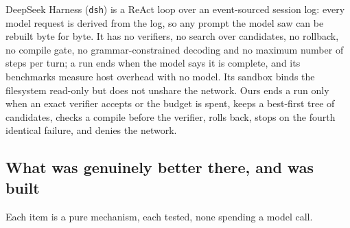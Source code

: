 DeepSeek Harness (\texttt{dsh}) is a ReAct loop over an event-sourced session log: every model request is derived from the log, so any prompt the model
saw can be rebuilt byte for byte. It has no verifiers, no search over candidates, no rollback, no compile gate, no grammar-constrained decoding and no
maximum number of steps per turn; a run ends when the model says it is complete, and its benchmarks measure host overhead with no model. Its sandbox
binds the filesystem read-only but does not unshare the network. Ours ends a run only when an exact verifier accepts or the budget is spent, keeps a
best-first tree of candidates, checks a compile before the verifier, rolls back, stops on the fourth identical failure, and denies the network.

\subsection{What was genuinely better there, and was built}

Each item is a pure mechanism, each tested, none spending a model call.

